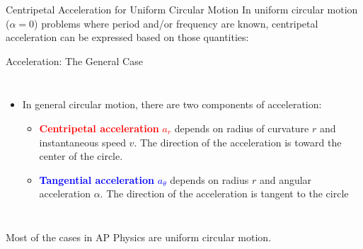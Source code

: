 \documentclass[12pt,compress,aspectratio=169]{beamer}
\newcommand{\mb}[1]{\ensuremath\mathbf{#1}}
\newcommand{\eq}[2]{\vspace{#1}{\Large\begin{displaymath}#2\end{displaymath}}}
\begin{document}
\begin{frame}{Centripetal Acceleration for Uniform Circular Motion}
  In uniform circular motion ($\alpha=0$) problems where period and/or
  frequency are known, centripetal acceleration can be expressed based on those
  quantities:

  \eq{-.15in}{
    \boxed{\mb{a}_r=-\frac{4\pi^2r}{T^2}\mb{\hat{r}}=-4\pi^2rf^2\mb{\hat{r}}}
  }
\end{frame}



\begin{frame}{Acceleration: The General Case}
  \begin{columns}
    
    \begin{itemize}
    \item In general circular motion, there are two components of acceleration:
      \begin{itemize}
      \item\textcolor{red}{\textbf{Centripetal acceleration} $a_r$} depends on
        radius of curvature $r$ and instantaneous speed $v$. The direction of
        the acceleration is toward the center of the circle.
      \item \textcolor{blue}{\textbf{Tangential acceleration} $a_\theta$}
        depends on radius $r$  and angular acceleration $\alpha$. The direction
        of the acceleration is tangent to the circle
      \end{itemize}
    \end{itemize}
  \end{columns}

  \vspace{.2in}Most of the cases in AP Physics are uniform circular motion.
\end{frame}
\end{document}
